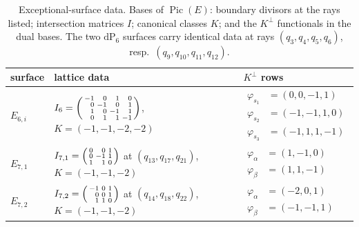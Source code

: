 \documentclass[11pt]{amsart}
\theoremstyle{definition}
\theoremstyle{remark}
\theoremstyle{plain}
\newcommand{\Pic}{\operatorname{Pic}}
\newcommand{\dP}{\mathrm{dP}}
\begin{document}
\begin{table}\centering
\caption{Exceptional-surface data.  Bases of $\Pic(E)$: boundary
divisors at the rays listed; intersection matrices $I$; canonical
classes $K$; and the $K^{\perp}$ functionals in the dual bases.  The
two $\dP_6$ surfaces carry identical data at rays
$(q_3,q_4,q_5,q_6)$, resp.\ $(q_9,q_{10},q_{11},q_{12})$.}
\label{tab:kperp}
\begin{tabular}{lll}
\toprule
surface & lattice data & $K^\perp$ rows\\
\midrule
$E_{6,i}$ &
$I_6=\begin{psmallmatrix*}[r]-1&0&1&0\\0&-1&0&1\\1&0&-1&1\\0&1&1&-1
\end{psmallmatrix*}$,\quad $K=(-1,-1,-2,-2)$ &
$\begin{aligned}\varphi_{s_1}&=(0,0,-1,1)\\
\varphi_{s_2}&=(-1,-1,1,0)\\
\varphi_{s_3}&=(-1,1,1,-1)\end{aligned}$\\[1.4em]
$E_{7,1}$ &
$I_{7,1}=\begin{psmallmatrix*}[r]0&0&1\\0&-1&1\\1&1&0
\end{psmallmatrix*}$ at $(q_{13},q_{17},q_{21})$,\quad
$K=(-1,-1,-2)$ &
$\begin{aligned}\varphi_{\alpha}&=(1,-1,0)\\
\varphi_{\beta}&=(1,1,-1)\end{aligned}$\\[1.2em]
$E_{7,2}$ &
$I_{7,2}=\begin{psmallmatrix*}[r]-1&0&1\\0&0&1\\1&1&0
\end{psmallmatrix*}$ at $(q_{14},q_{18},q_{22})$,\quad
$K=(-1,-1,-2)$ &
$\begin{aligned}\varphi_{\alpha}&=(-2,0,1)\\
\varphi_{\beta}&=(-1,-1,1)\end{aligned}$\\
\bottomrule
\end{tabular}
\end{table}
\end{document}
